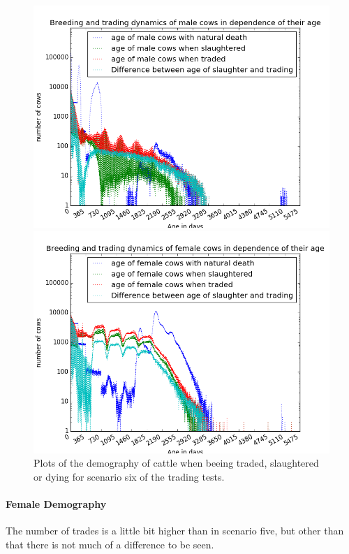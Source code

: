 \begin{figure}[htbp]
\begin{minipage}{0.5\textwidth}
\centering
\noindent\includegraphics[width=0.9\linewidth,height=\textheight,
keepaspectratio]{scen6maleDemography.png} 
\end{minipage}
\begin{minipage}{0.5\textwidth}
\centering
\noindent\includegraphics[width=0.9\linewidth,height=\textheight,
keepaspectratio]{scen6femaleDemography.png} 
\end{minipage}
\caption[Demography in Scenario 6]{Plots of the demography of cattle when beeing traded, slaughtered or dying for scenario six of the trading tests.}
\label{fig:demographyScen6}
\end{figure} 
\paragraph{Female Demography}
The number of trades is a little bit higher than in scenario five, but other than that there is not much of a difference to be seen.
